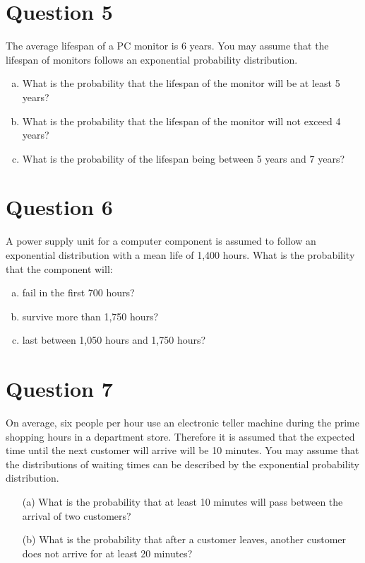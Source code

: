 \documentclass[]{article}
\begin{document}
\section*{Question 5}
The average lifespan of a PC monitor is 6 years. You may assume that the lifespan of monitors
follows an exponential probability distribution.
\begin{enumerate}[(a)]
    \item  What is the probability that the lifespan of the monitor will be at least 5 years?
\item What is the probability that the lifespan of the monitor will not exceed 4 years?
\item  What is the probability of the lifespan being between 5 years and 7 years?
\end{enumerate}


\section*{Question 6}
A power supply unit for a computer component is assumed to follow an
exponential distribution with a mean life of 1,400 hours. What is the
probability that the component will:

\begin{enumerate}[(a)]
\item  fail in the first 700 hours?
\item  survive more than 1,750 hours?
\item  last between 1,050 hours and 1,750 hours?
\end{enumerate}


\section*{Question 7}
On average, six people per hour use an electronic teller machine during the
prime shopping hours in a department store. Therefore it is assumed that
the expected time until the next customer will arrive will be 10 minutes.
You may assume that the distributions of waiting times can be described
by the exponential probability distribution.
\begin{itemize}
\item[(a)]  What is the probability that at least 10 minutes will pass
between the arrival of two customers?
\item[(b)]  What is the probability that after a customer leaves, another
customer does not arrive for at least 20 minutes?
\end{itemize}
\end{document}
